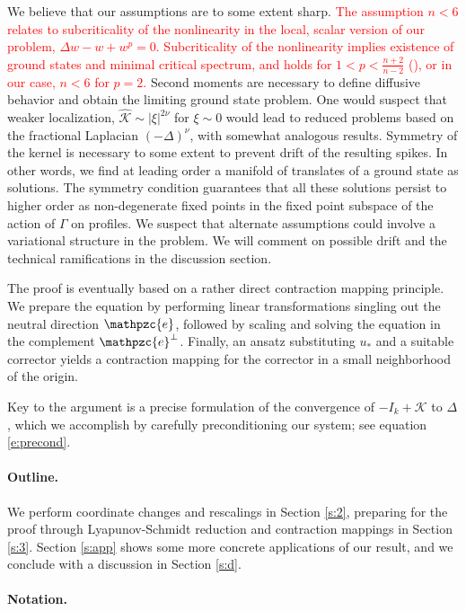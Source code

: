 \documentclass[10pt]{article}
\newcommand{\K}{\mathcal{K}}
\newcommand{\e}{\mathpzc{e}}
\begin{document}
We believe that our assumptions are to some extent sharp. \textcolor{red}{The assumption $n < 6$ relates to subcriticality of the nonlinearity in the local, scalar version of our problem,
 $\Delta w - w + w^p = 0.$ Subcriticality of the nonlinearity implies existence of ground states and minimal critical spectrum, and holds for $1 < p < \frac{n+2}{n-2}$
 (\cite[Lem. 13.3]{gs}), or in our case, $n<6$ for $p=2$.} Second moments are necessary to define diffusive behavior and obtain the limiting ground state problem. One would suspect that weaker localization, $\hat{\K}\sim |\xi|^{2\nu}$ for $\xi\sim 0$ would lead to reduced problems based on the fractional Laplacian $(-\Delta)^\nu$, with somewhat analogous results. Symmetry of the kernel is necessary to some extent to prevent drift of the resulting spikes. In other words, we find at leading order a manifold of translates of a ground state as solutions. The symmetry condition guarantees that all these solutions persist to higher order as non-degenerate fixed points in the fixed point subspace of the action of $\Gamma$ on profiles. We suspect that alternate assumptions could involve a variational structure in the problem. We will comment on possible drift and the technical ramifications in the discussion section.

The proof is eventually based on a rather direct contraction mapping principle. We prepare the equation by performing linear transformations singling out the neutral direction ${\e}$, followed by scaling and solving the equation in the complement ${\e}^\perp$. Finally, an ansatz substituting $u_*$ and a suitable corrector yields a contraction mapping for the corrector in a small neighborhood of the origin. 

Key to the argument is a precise formulation of the convergence of $-I_k+\K$ to $\Delta$, which we accomplish by carefully preconditioning our system; see equation \eqref{e:precond}.


\paragraph{Outline.} We perform coordinate changes and rescalings in Section \ref{s:2}, preparing for the proof through Lyapunov-Schmidt reduction and contraction mappings in Section \ref{s:3}. Section \ref{s:app} shows some more concrete applications of our result, and we conclude with a discussion in Section \ref{s:d}.

\paragraph{Notation.}
\end{document}
